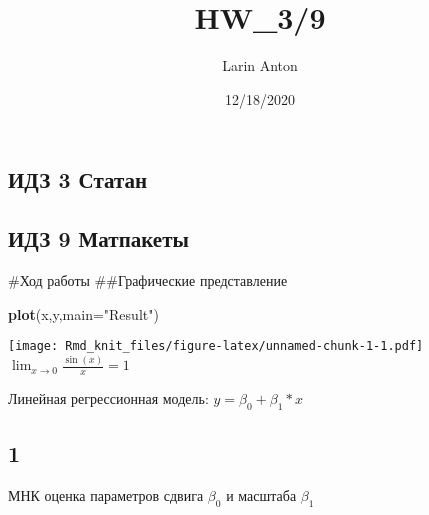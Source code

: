 \documentclass[]{article}
\title{HW\_3/9}
\author{Larin Anton}
\date{12/18/2020}
\newenvironment{Shaded}{\begin{snugshade}}{\end{snugshade}}
\newcommand{\DataTypeTok}[1]{\textcolor[rgb]{0.13,0.29,0.53}{#1}}
\newcommand{\DecValTok}[1]{\textcolor[rgb]{0.00,0.00,0.81}{#1}}
\newcommand{\KeywordTok}[1]{\textcolor[rgb]{0.13,0.29,0.53}{\textbf{#1}}}
\newcommand{\NormalTok}[1]{#1}
\newcommand{\OperatorTok}[1]{\textcolor[rgb]{0.81,0.36,0.00}{\textbf{#1}}}
\newcommand{\StringTok}[1]{\textcolor[rgb]{0.31,0.60,0.02}{#1}}
\begin{document}
\maketitle

\hypertarget{ux438ux434ux437-3-ux441ux442ux430ux442ux430ux43d}{%
\subsection{ИДЗ 3
Статан}\label{ux438ux434ux437-3-ux441ux442ux430ux442ux430ux43d}}

\hypertarget{ux438ux434ux437-9-ux43cux430ux442ux43fux430ux43aux435ux442ux44b}{%
\subsection{ИДЗ 9
Матпакеты}\label{ux438ux434ux437-9-ux43cux430ux442ux43fux430ux43aux435ux442ux44b}}

\#Ход работы \#\#Графические представление

\begin{Shaded}
\begin{Highlighting}[]
\KeywordTok{plot}\NormalTok{(x,y,}\DataTypeTok{main=}\StringTok{"Result"}\NormalTok{)}
\end{Highlighting}
\end{Shaded}

\texttt{[image: Rmd\_knit\_files/figure-latex/unnamed-chunk-1-1.pdf]}
\(\lim_{x \to 0}\frac{\sin(x)}{x} = 1\)

Линейная регрессионная модель: \(y = \beta_0 + \beta_1*x\)

\hypertarget{section}{%
\subsection{1}\label{section}}

МНК оценка параметров сдвига \(\beta_0\) и масштаба \(\beta_1\)

\begin{Shaded}
\end{Shaded}
\end{document}
